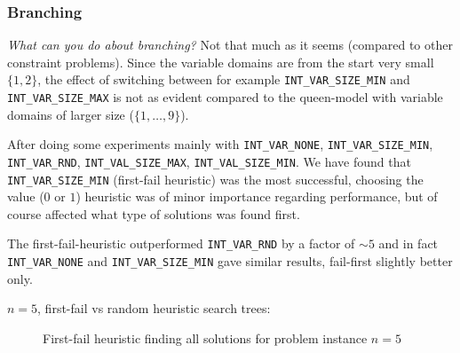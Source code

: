 \documentclass[a4paper, 11pt]{article}
\begin{document}
\subsubsection*{Branching}
\textit{What can you do about branching?} Not that much as it seems (compared to other constraint problems). Since the variable domains are from the start very small $\{1,2\}$, the effect of switching between  for example \texttt{INT\_VAR\_SIZE\_MIN} and \texttt{INT\_VAR\_SIZE\_MAX} is not as evident compared to the queen-model with variable domains of larger size ($\{1, \ldots , 9 \}$).

After doing some experiments mainly with \texttt{INT\_VAR\_NONE}, \texttt{INT\_VAR\_SIZE\_MIN}, \texttt{INT\_VAR\_RND}, \texttt{INT\_VAL\_SIZE\_MAX}, \texttt{INT\_VAL\_SIZE\_MIN}. We have found that \texttt{INT\_VAR\_SIZE\_MIN} (first-fail heuristic) was the most successful, choosing the value ($0$ or $1$) heuristic was of minor importance regarding performance, but of course affected what type of solutions was found first.

The first-fail-heuristic outperformed \texttt{INT\_VAR\_RND} by a factor of $\sim 5$ and in fact \texttt{INT\_VAR\_NONE} and \texttt{INT\_VAR\_SIZE\_MIN} gave similar results, fail-first slightly better only.

$n = 5$, first-fail vs random heuristic search trees:

\begin{figure}[H]
  \begin{center}
    \caption{First-fail heuristic finding all solutions for problem instance $n = 5$}
    \label{fig:ff5}
  \end{center}
\end{figure}
\end{document}
